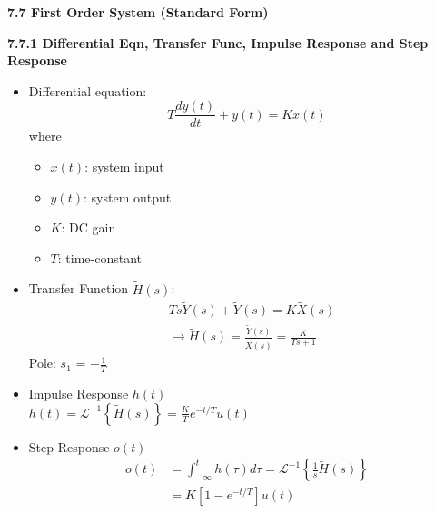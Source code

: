 \documentclass[landscape,a4paper]{extarticle}
\newcommand{\invlap}[1]{\mathcal{L}^{-1}\left\{#1\right\}}
\begin{document}
\begin{multicols*}{5}
    \textbf{7.7 First Order System (Standard Form)}

    \textbf{7.7.1 Differential Eqn, Transfer Func, Impulse Response and Step Response}
    \begin{itemize}
        \item Differential equation:
        \[
            T\frac{dy(t)}{dt}+y(t)=Kx(t) \tag{7.26}
        \]
        where 
        \begin{itemize}
            \item $x(t)$: system input
            \item $y(t)$: system output
            \item $K$: DC gain
            \item $T$: time-constant
        \end{itemize}
        \item Transfer Function $\tilde{H}(s)$:
        \begin{align*}
            &Ts\tilde{Y}(s) + \tilde{Y}(s) = K \tilde{X}(s)\\
            &\rightarrow \tilde{H}(s) = \frac{\tilde{Y}(s)}{\tilde{X}(s)} = \frac{K}{Ts + 1} \tag{7.27}
        \end{align*}
        Pole: $s_1$ = $-\frac{1}{T}$
        \item Impulse Response $h(t)$\\
        $h(t) = \invlap{\tilde{H}(s)} = \frac{K}{T}e^{-t/T}u(t)$
        \item Step Response $o(t)$
        \begin{align*}
            o(t) &= \int_{-\infty}^{t} h(\tau) d \tau = \invlap{\frac{1}{s}\tilde{H}(s)}\\
            &= K\left[1-e^{-t/T}\right]u(t)
        \end{align*}
    \end{itemize}


\end{multicols*}
\end{document}
